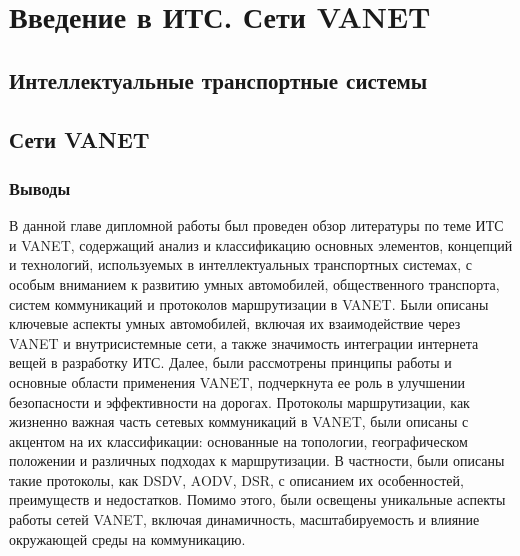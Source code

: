 \chapter{Введение в ИТС. Сети VANET}

\section{Интеллектуальные транспортные системы}



\section{Сети VANET}



\subsection*{Выводы}

В данной главе дипломной работы был проведен обзор литературы по теме ИТС и VANET, содержащий анализ и классификацию основных элементов, концепций и технологий, используемых в интеллектуальных транспортных системах, с особым вниманием к развитию умных автомобилей, общественного транспорта, систем коммуникаций и протоколов маршрутизации в VANET. Были описаны ключевые аспекты умных автомобилей, включая их взаимодействие через VANET и внутрисистемные сети, а также значимость интеграции интернета вещей в разработку ИТС. Далее, были рассмотрены принципы работы и основные области применения VANET, подчеркнута ее роль в улучшении безопасности и эффективности на дорогах. Протоколы маршрутизации, как жизненно важная часть сетевых коммуникаций в VANET, были описаны с акцентом на их классификации: основанные на топологии, географическом положении и различных подходах к маршрутизации. В частности, были описаны такие протоколы, как DSDV, AODV, DSR, с описанием их особенностей, преимуществ и недостатков. Помимо этого, были освещены уникальные аспекты работы сетей VANET, включая динамичность, масштабируемость и влияние окружающей среды на коммуникацию.
